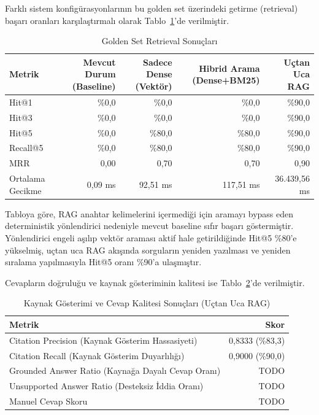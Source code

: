 Farklı sistem konfigürasyonlarının bu golden set üzerindeki getirme (retrieval) başarı oranları karşılaştırmalı olarak Tablo~\ref{tab:retrieval_metrikleri}'de verilmiştir. 

\begin{table}[H]
\centering
\caption{Golden Set Retrieval Sonuçları}
\label{tab:retrieval_metrikleri}
\begin{tabular}{lrrrr}
\hline
Metrik & Mevcut Durum (Baseline) & Sadece Dense (Vektör) & Hibrid Arama (Dense+BM25) & Uçtan Uca RAG \\
\hline
Hit@1 & \%0,0 & \%0,0 & \%0,0 & \%90,0 \\
Hit@3 & \%0,0 & \%0,0 & \%0,0 & \%90,0 \\
Hit@5 & \%0,0 & \%80,0 & \%80,0 & \%90,0 \\
Recall@5 & \%0,0 & \%80,0 & \%80,0 & \%90,0 \\
MRR & 0,00 & 0,70 & 0,70 & 0,90 \\
Ortalama Gecikme & 0,09 ms & 92,51 ms & 117,51 ms & 36.439,56 ms \\
\hline
\end{tabular}
\end{table}

Tabloya göre, RAG anahtar kelimelerini içermediği için aramayı bypass eden deterministik yönlendirici nedeniyle mevcut baseline sıfır başarı göstermiştir. Yönlendirici engeli aşılıp vektör araması aktif hale getirildiğinde Hit@5 \%80'e yükselmiş, uçtan uca RAG akışında sorguların yeniden yazılması ve yeniden sıralama yapılmasıyla Hit@5 oranı \%90'a ulaşmıştır.

Cevapların doğruluğu ve kaynak gösteriminin kalitesi ise Tablo~\ref{tab:citation_quality}'de verilmiştir.

\begin{table}[H]
\centering
\caption{Kaynak Gösterimi ve Cevap Kalitesi Sonuçları (Uçtan Uca RAG)}
\label{tab:citation_quality}
\begin{tabular}{lr}
\hline
Metrik & Skor \\
\hline
Citation Precision (Kaynak Gösterim Hassasiyeti) & 0,8333 (\%83,3) \\
Citation Recall (Kaynak Gösterim Duyarlılığı) & 0,9000 (\%90,0) \\
Grounded Answer Ratio (Kaynağa Dayalı Cevap Oranı) & TODO \\
Unsupported Answer Ratio (Desteksiz İddia Oranı) & TODO \\
Manuel Cevap Skoru & TODO \\
\hline
\end{tabular}
\end{table}

